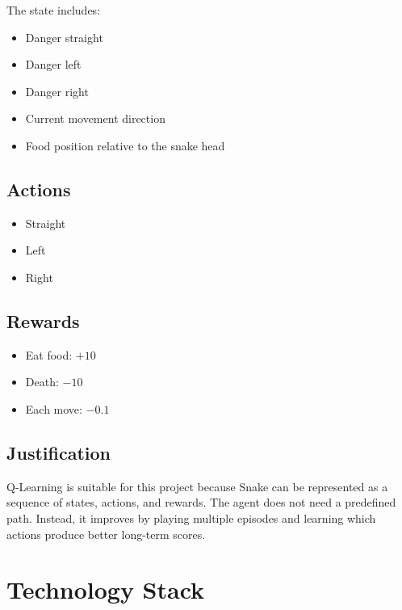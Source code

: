 \documentclass[12pt,a4paper]{article}
\begin{document}
The state includes:

\begin{itemize}
    \item Danger straight
    \item Danger left
    \item Danger right
    \item Current movement direction
    \item Food position relative to the snake head
\end{itemize}

\subsection{Actions}

\begin{itemize}
    \item Straight
    \item Left
    \item Right
\end{itemize}

\subsection{Rewards}

\begin{itemize}
    \item Eat food: $+10$
    \item Death: $-10$
    \item Each move: $-0.1$
\end{itemize}

\subsection{Justification}

Q-Learning is suitable for this project because Snake can be represented as a sequence of states, actions, and rewards. The agent does not need a predefined path. Instead, it improves by playing multiple episodes and learning which actions produce better long-term scores.

\section{Technology Stack}
\end{document}
